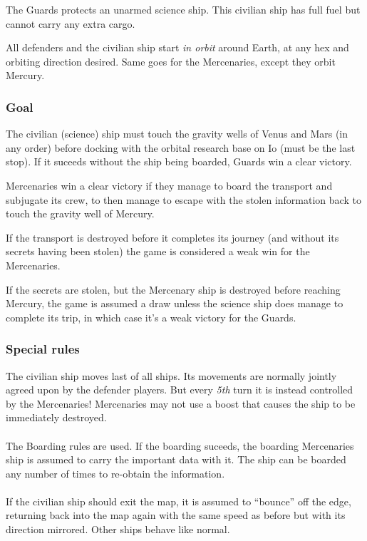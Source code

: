 \documentclass[a4paper,12pt,notitlepage,twocolumn]{article}
\begin{document}
The Guards protects an unarmed science ship. This civilian ship has
full fuel but cannot carry any extra cargo. 

All defenders and the civilian ship start \emph{in orbit} around Earth,
at any hex and orbiting direction desired. Same goes for the
Mercenaries, except they orbit Mercury.

\subsubsection*{Goal}

The civilian (science) ship must touch the gravity wells of Venus and Mars (in
any order) before docking with the orbital research base on Io
(must be the last stop).  If it suceeds without the ship being
boarded, Guards win a clear victory. 

Mercenaries win a clear victory if they manage to board the transport
and subjugate its crew, to then manage to escape with the stolen information
back to touch the gravity well of Mercury. 

If the transport is destroyed before it completes its journey (and
without its secrets having been stolen) the game is considered a weak
win for the Mercenaries. 

If the secrets are stolen, but the Mercenary ship is destroyed before
reaching Mercury, the game is assumed a draw unless the science ship
does manage to complete its trip, in which case it's a weak victory
for the Guards.  

\subsubsection*{Special rules}

The civilian ship moves last of all ships. Its movements are normally jointly
agreed upon by the defender players. But every \emph{5th} turn it is instead
controlled by the Mercenaries! Mercenaries may not use a boost
that causes the ship to be immediately destroyed. 
\\\\
The Boarding rules are used. If the boarding suceeds, the boarding
Mercenaries ship is assumed to carry the important data with it. The
ship can be boarded any number of times to re-obtain the information. 
\\\\
If the civilian ship should exit the map, it is assumed to ``bounce''
off the edge, returning back into the map again with the same speed as
before but with its direction mirrored. Other ships behave like normal.
\end{document}
